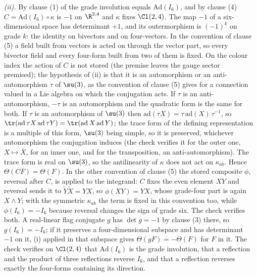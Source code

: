 \emph{(ii).} By clause (1) of  the grade involution equals $\mathrm{Ad}(I_{6})$, and by clause (4) $C = \mathrm{Ad}(I_{6}) \circ \kappa$ is $-1$ on $\R^{2,4}$ and $\kappa$ fixes $\Cl(2,4)$. The map $-1$ of a six-dimensional space has determinant $+1$, and its outermorphism is $(-1)^{k}$ on grade $k$: the identity on bivectors and on four-vectors. In the convention of clause (5) a field built from vectors is acted on through the vector part, so every bivector field and every four-form built from two of them is fixed. On the colour index the action of $C$ is not stored (the premise  leaves the gauge sector premised); the hypothesis of (ii) is that it is an automorphism or an anti-automorphism $\tau$ of $\su(3)$, as the convention of clause (5) gives for a connection valued in a Lie algebra on which the conjugation acts. If $\tau$ is an anti-automorphism, $-\tau$ is an automorphism and the quadratic form is the same for both. If $\tau$ is an automorphism of $\su(3)$ then $\mathrm{ad}(\tau X) = \tau\,\mathrm{ad}(X)\,\tau^{-1}$, so $\tr(\mathrm{ad}\,\tau X\,\mathrm{ad}\,\tau Y) = \tr(\mathrm{ad}\,X\,\mathrm{ad}\,Y)$; the trace form of the defining representation is a multiple of this form, $\su(3)$ being simple, so it is preserved, whichever automorphism the conjugation induces (the check verifies it for the outer one, $X \mapsto \bar{X}$, for an inner one, and for the transposition, an anti-automorphism). The trace form is real on $\su(3)$, so the antilinearity of $\kappa$ does not act on $\kappa_{ab}$. Hence $\Theta(CF) = \Theta(F)$. In the other convention of clause (5) the stored composite $\phi$, reversal after $C$, is applied to the integrand: $C$ fixes the even element $XY$ and reversal sends it to $\widetilde{Y}\widetilde{X} = YX$, so $\phi(XY) = YX$, whose grade-four part is again $X \wedge Y$; with the symmetric $\kappa_{ab}$ the term is fixed in this convention too, while $\phi(I_{6}) = -I_{6}$ because reversal changes the sign of grade six. The check verifies both. A real-linear flag conjugate $g$ has $\det g = -1$ by clause (3) there, so $g(I_{6}) = -I_{6}$; if it preserves a four-dimensional subspace and has determinant $-1$ on it, (i) applied in that subspace gives $\Theta(gF) = -\Theta(F)$ for $F$ in it. The check verifies on $\Cl(2,4)$ that $\mathrm{Ad}(I_{6})$ is the grade involution, that a reflection and the product of three reflections reverse $I_{6}$, and that a reflection reverses exactly the four-forms containing its direction.

